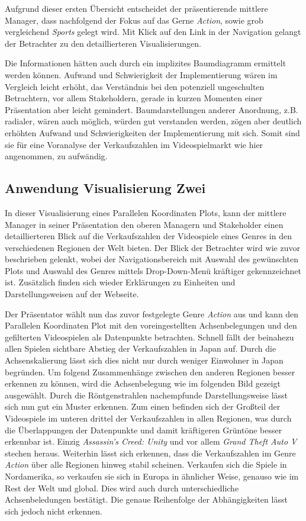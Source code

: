 \documentclass[usegeometry=true]{scrartcl}
\begin{document}
Aufgrund dieser ersten Übersicht entscheidet der präsentierende mittlere Manager, dass nachfolgend der Fokus auf das Gerne \textit{Action}, sowie grob vergleichend \textit{Sports} gelegt wird.
Mit Klick auf den Link in der Navigation gelangt der Betrachter zu den detaillierteren Visualisierungen.

Die Informationen hätten auch durch ein implizites Baumdiagramm ermittelt werden können. Aufwand und Schwierigkeit der Implementierung wären im Vergleich leicht erhöht, das Verständnis bei den potenziell ungeschulten Betrachtern, vor allem Stakeholdern, gerade in kurzen Momenten einer Präsentation aber leicht gemindert. 
Baumdarstellungen anderer Anordnung, z.B. radialer, wären auch möglich, würden gut verstanden werden, zögen aber deutlich erhöhten Aufwand und Schwierigkeiten der Implementierung mit sich. 
Somit sind sie für eine Voranalyse der Verkaufszahlen im Videospielmarkt wie hier angenommen, zu aufwändig.

\subsection{Anwendung Visualisierung Zwei}
In dieser Visualisierung eines Parallelen Koordinaten Plots, kann der mittlere Manager in seiner Präsentation den oberen Managern und Stakeholder einen detaillierteren Blick auf die Verkaufszahlen der Videospiele eines Genres in den verschiedenen Regionen der Welt bieten.
Der Blick der Betrachter wird wie zuvor beschrieben gelenkt, wobei der Navigationsbereich mit Auswahl des gewünschten Plots und Auswahl des Genres mittels Drop-Down-Menü kräftiger gekennzeichnet ist. 
Zusätzlich finden sich wieder Erklärungen zu Einheiten und Darstellungsweisen auf der Webseite.

Der Präsentator wählt nun das zuvor festgelegte Genre \textit{Action} aus und kann den Parallelen Koordinaten Plot mit den voreingestellten Achsenbelegungen und den gefilterten Videospielen als Datenpunkte betrachten. 
Schnell fällt der beinahezu allen Spielen sichtbare Abstieg der Verkaufszahlen in Japan auf. Durch die Achsenskalierung lässt sich dies nicht nur durch weniger Einwohner in Japan begründen.
Um folgend Zusammenhänge zwischen den anderen Regionen besser erkennen zu können, wird die Achsenbelegung wie im folgenden Bild gezeigt ausgewählt.
Durch die Röntgenstrahlen nachempfunde Darstellungsweise lässt sich nun gut ein Muster erkennen. 
Zum einen befinden sich der Großteil der Videospiele im unteren drittel der Verkaufszahlen in allen Regionen, was durch die Überlappungen der Datenpunkte und damit kräftigeren Grüntöne besser erkennbar ist.
Einzig \textit{Assassin's Creed: Unity} und vor allem \textit{Grand Theft Auto V} stechen heraus. 
Weiterhin lässt sich erkennen, dass die Verkaufszahlen im Genre \textit{Action} über alle Regionen hinweg stabil scheinen. 
Verkaufen sich die Spiele in Nordamerika, so verkaufen sie sich in Europa in ähnlicher Weise, genauso wie im Rest der Welt und global.
Dies wird auch durch unterschiedliche Achsenbeledungen bestätigt. Die genaue Reihenfolge der Abhängigkeiten lässt sich jedoch nicht erkennen. 
\end{document}
